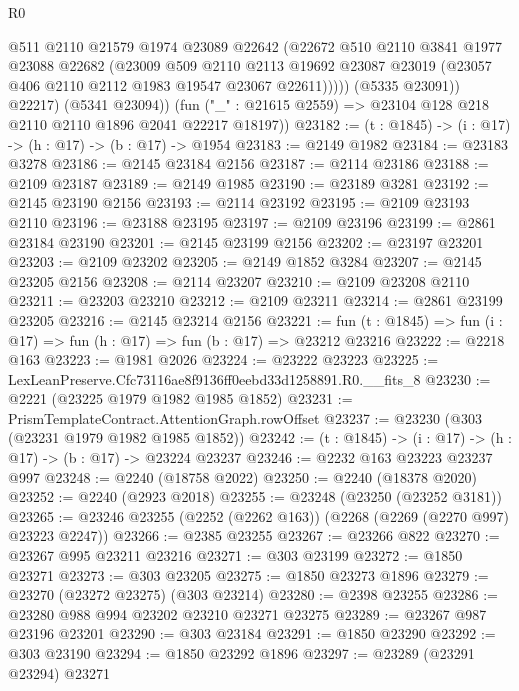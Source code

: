 \begin{lexlean}{R0}
\begin{coremodule}
                @511
                @2110
                @21579
                @1974
                @23089
                @22642
                (@22672
                  @510
                  @2110
                  @3841
                  @1977
                  @23088
                  @22682
                  (@23009
                    @509
                    @2110
                    @2113
                    @19692
                    @23087
                    @23019
                    (@23057 @406 @2110 @2112 @1983 @19547 @23067 @22611)))))
            (@5335 @23091))
          @22217)
        (@5341 @23094))
      (fun ("_" : @21615 @2559) => @23104 @128 @218 @2110 @2110 @1896 @2041 @22217 @18197))
@23182 := (t : @1845) -> (i : @17) -> (h : @17) -> (b : @17) -> @1954
@23183 := @2149 @1982
@23184 := @23183 @3278
@23186 := @2145 @23184 @2156
@23187 := @2114 @23186
@23188 := @2109 @23187
@23189 := @2149 @1985
@23190 := @23189 @3281
@23192 := @2145 @23190 @2156
@23193 := @2114 @23192
@23195 := @2109 @23193 @2110
@23196 := @23188 @23195
@23197 := @2109 @23196
@23199 := @2861 @23184 @23190
@23201 := @2145 @23199 @2156
@23202 := @23197 @23201
@23203 := @2109 @23202
@23205 := @2149 @1852 @3284
@23207 := @2145 @23205 @2156
@23208 := @2114 @23207
@23210 := @2109 @23208 @2110
@23211 := @23203 @23210
@23212 := @2109 @23211
@23214 := @2861 @23199 @23205
@23216 := @2145 @23214 @2156
@23221 := fun (t : @1845) => fun (i : @17) => fun (h : @17) => fun (b : @17) => @23212 @23216
@23222 := @2218 @163
@23223 := @1981 @2026
@23224 := @23222 @23223
@23225 := LexLeanPreserve.Cfc73116ae8f9136ff0eebd33d1258891.R0.__fits_8
@23230 := @2221 (@23225 @1979 @1982 @1985 @1852)
@23231 := PrismTemplateContract.AttentionGraph.rowOffset
@23237 := @23230 (@303 (@23231 @1979 @1982 @1985 @1852))
@23242 := (t : @1845) -> (i : @17) -> (h : @17) -> (b : @17) -> @23224 @23237
@23246 := @2232 @163 @23223 @23237 @997
@23248 := @2240 (@18758 @2022)
@23250 := @2240 (@18378 @2020)
@23252 := @2240 (@2923 @2018)
@23255 := @23248 (@23250 (@23252 @3181))
@23265 := @23246 @23255 (@2252 (@2262 @163)) (@2268 (@2269 (@2270 @997) @23223 @2247))
@23266 := @2385 @23255
@23267 := @23266 @822
@23270 := @23267 @995 @23211 @23216
@23271 := @303 @23199
@23272 := @1850 @23271
@23273 := @303 @23205
@23275 := @1850 @23273 @1896
@23279 := @23270 (@23272 @23275) (@303 @23214)
@23280 := @2398 @23255
@23286 := @23280 @988 @994 @23202 @23210 @23271 @23275
@23289 := @23267 @987 @23196 @23201
@23290 := @303 @23184
@23291 := @1850 @23290
@23292 := @303 @23190
@23294 := @1850 @23292 @1896
@23297 := @23289 (@23291 @23294) @23271

\end{coremodule}
\end{lexlean}
